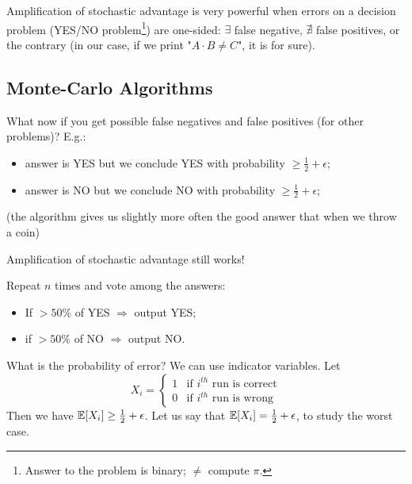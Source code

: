 	Amplification of stochastic advantage is very powerful when errors on a decision problem (YES/NO problem\footnote{Answer to the problem is binary; $\neq$ compute $\pi$.}) are one-sided: $\exists$ false negative, $\nexists$ false positives, or the contrary (in our case, if we print "$A\cdot B\neq C$", it is for sure).\\

\subsection{Monte-Carlo Algorithms}

	What now if you get possible false negatives and false positives (for other problems)? E.g.:
	\begin{itemize}
		\item answer is YES but we conclude YES with probability $\geq \frac{1}{2}+\epsilon$;
		\item answer is NO but we conclude NO with probability $\geq \frac{1}{2}+\epsilon$;
	\end{itemize}
	(the algorithm gives us slightly more often the good answer that when we throw a coin)
	
	Amplification of stochastic advantage still works!

  Repeat $n$ times and vote among the answers:
	\begin{itemize}
		\item If $>50\%$ of YES $\Rightarrow$ output YES;
		\item if $>50\%$ of NO $\Rightarrow$ output NO.
	\end{itemize}
	What is the probability of error? We can use indicator variables. Let
	$$X_i=\left\{
	\begin{array}{ll}
       1&\text{if }i^{th}\text{ run is correct}\\
       0&\text{if }i^{th}\text{ run is wrong}
			\end{array}
  \right.
  $$
	Then we have $\mathbb{E}[X_i]\geq \frac{1}{2}+\epsilon$. Let us say that $\mathbb{E}[X_i]=\frac{1}{2}+\epsilon$, to study the worst case.
	

